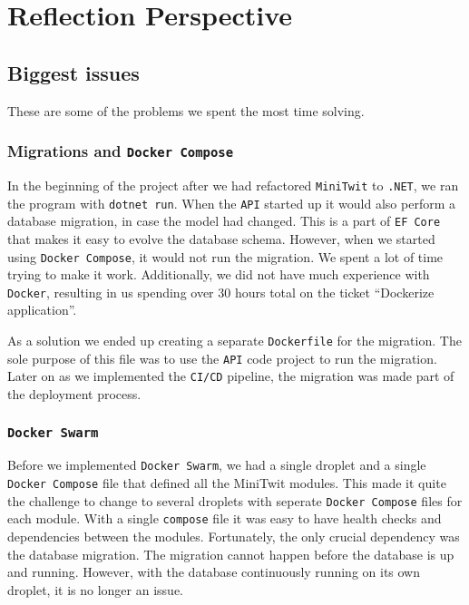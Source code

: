 \section{Reflection Perspective}

\subsection{Biggest issues}

These are some of the problems we spent the most time solving.

\subsubsection{Migrations and \texttt{Docker Compose}}

In the beginning of the project after we had refactored \texttt{MiniTwit} to \texttt{.NET},
we ran the program with \texttt{dotnet run}. 
When the \texttt{API} started up it would also perform a database migration,
in case the model had changed. This is a part of \texttt{EF Core}
that makes it easy to evolve the database schema.
However, when we started using \texttt{Docker Compose}, it would not run the migration.
We spent a lot of time trying to make it work.
Additionally, we did not have much experience with \texttt{Docker},
resulting in us spending over 30 hours total on the ticket
``Dockerize application''.

As a solution we ended up creating a separate \texttt{Dockerfile} for the migration.
The sole purpose of this file was to use the \texttt{API} code project to run the migration.
Later on as we implemented the \texttt{CI/CD} pipeline, 
the migration was made part of the deployment process.

\subsubsection{\texttt{Docker Swarm}}

Before we implemented \texttt{Docker Swarm}, we had a single droplet 
and a single \texttt{Docker Compose} file that defined all the MiniTwit modules.
This made it quite the challenge to change to several droplets with 
seperate \texttt{Docker Compose} files for each module.
With a single \texttt{compose} file it was easy to have health checks and
dependencies between the modules. 
Fortunately, the only crucial dependency was the database migration.
The migration cannot happen before the database is up and running.
However, with the database continuously running on its own droplet,
it is no longer an issue.

